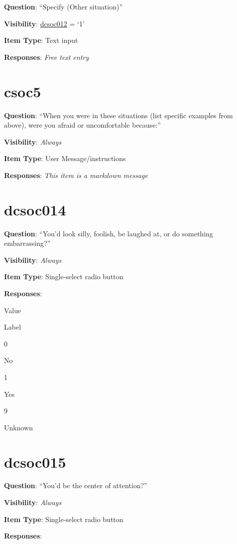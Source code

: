 \documentclass[]{book}
\begin{document}
\textbf{Question}: ``Specify (Other situation)''

\textbf{Visibility}: \protect\hyperlink{dcsoc012}{dcsoc012} = `1'

\textbf{Item Type}: Text input

\textbf{Responses}: \emph{Free text entry}

\hypertarget{csoc5}{%
\section{csoc5}\label{csoc5}}

\textbf{Question}: ``When you were in these situations (list specific examples from above), were you afraid or uncomfortable because:''

\textbf{Visibility}: \emph{Always}

\textbf{Item Type}: User Message/instructions

\textbf{Responses}: \emph{This item is a markdown message}

\hypertarget{dcsoc014}{%
\section{dcsoc014}\label{dcsoc014}}

\textbf{Question}: ``You'd look silly, foolish, be laughed at, or do something embarrassing?''

\textbf{Visibility}: \emph{Always}

\textbf{Item Type}: Single-select radio button

\textbf{Responses}:

Value

Label

0

No

1

Yes

9

Unknown

\hypertarget{dcsoc015}{%
\section{dcsoc015}\label{dcsoc015}}

\textbf{Question}: ``You'd be the center of attention?''

\textbf{Visibility}: \emph{Always}

\textbf{Item Type}: Single-select radio button

\textbf{Responses}:
\end{document}
